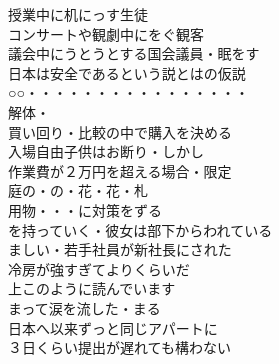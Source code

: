 \begin{multicols}{2}
授業中に机にっす生徒\\
コンサートや観劇中にをぐ観客\\
議会中にうとうとする国会議員・眠をす\\
日本は安全であるという説とはの仮説\\

○○・・・・・・・・・・・・・・・・\\

解体・\\
買い回り・比較の中で購入を決める\\
入場自由子供はお断り・しかし\\
作業費が２万円を超える場合・限定\\

庭の・の・花・花・札\\
用物・・・に対策をずる\\
を持っていく・彼女は部下からわれている\\
ましい・若手社員が新社長にされた\\
冷房が強すぎてよりくらいだ\\

上このように読んでいます\\
まって涙を流した・まる\\
日本へ以来ずっと同じアパートに\\
３日くらい提出が遅れても構わない\\


\end{multicols}
